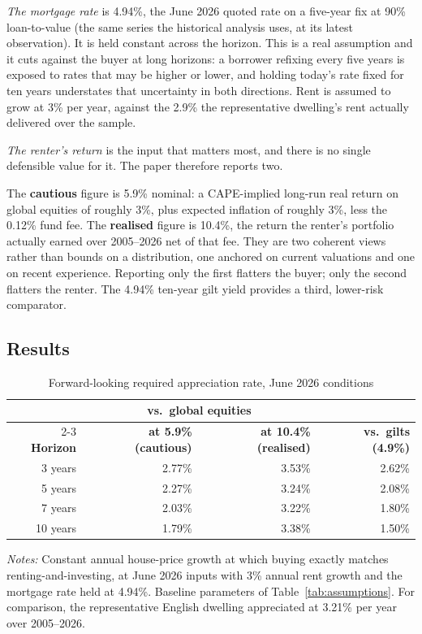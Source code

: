 \emph{The mortgage rate} is 4.94\%, the June 2026 quoted rate on a five-year fix at 90\% loan-to-value (the same series the historical analysis uses, at its latest observation). It is held constant across the horizon. This is a real assumption and it cuts against the buyer at long horizons: a borrower refixing every five years is exposed to rates that may be higher or lower, and holding today's rate fixed for ten years understates that uncertainty in both directions. Rent is assumed to grow at 3\% per year, against the 2.9\% the representative dwelling's rent actually delivered over the sample.

\emph{The renter's return} is the input that matters most, and there is no single defensible value for it. The paper therefore reports two.

The \textbf{cautious} figure is 5.9\% nominal: a CAPE-implied long-run real return on global equities of roughly 3\%, plus expected inflation of roughly 3\%, less the 0.12\% fund fee. The \textbf{realised} figure is 10.4\%, the return the renter's portfolio actually earned over 2005--2026 net of that fee. They are two coherent views rather than bounds on a distribution, one anchored on current valuations and one on recent experience. Reporting only the first flatters the buyer; only the second flatters the renter. The 4.94\% ten-year gilt yield provides a third, lower-risk comparator.

\subsection{Results}

\begin{table}[H]
  \centering
  \caption{Forward-looking required appreciation rate, June 2026 conditions}
  \label{tab:rar_horizon}
  \begin{threeparttable}
  \begin{tabular}{@{}rrrr@{}}
    \toprule
    & \multicolumn{2}{c}{\textbf{vs.\ global equities}} & \\
    \cmidrule(lr){2-3}
    \textbf{Horizon} & \textbf{at 5.9\% (cautious)} & \textbf{at 10.4\% (realised)} & \textbf{vs.\ gilts (4.9\%)} \\
    \midrule
    3 years  & 2.77\% & 3.53\% & 2.62\% \\
    5 years  & 2.27\% & 3.24\% & 2.08\% \\
    7 years  & 2.03\% & 3.22\% & 1.80\% \\
    10 years & 1.79\% & 3.38\% & 1.50\% \\
    \bottomrule
  \end{tabular}
  \begin{tablenotes}
    \small
    \item \textit{Notes:} Constant annual house-price growth at which buying exactly matches renting-and-investing, at June 2026 inputs with 3\% annual rent growth and the mortgage rate held at 4.94\%. Baseline parameters of Table~\ref{tab:assumptions}. For comparison, the representative English dwelling appreciated at 3.21\% per year over 2005--2026.
  \end{tablenotes}
  \end{threeparttable}
\end{table}

